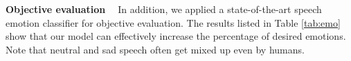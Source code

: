 \documentclass{article}
\begin{document}


\noindent \textbf{Objective evaluation \ } In addition, we applied a state-of-the-art speech emotion classifier \cite{mirsamadi2017automatic} for objective evaluation. The results listed in Table \ref{tab:emo} show that our model can effectively increase the percentage of desired emotions. Note that neutral and sad speech often get mixed up even by humans.


\end{document}
